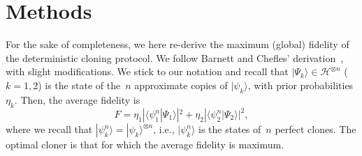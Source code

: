 \documentclass[aps,pra,twocolumn,showpacs]{revtex4-1}
\begin{document}
\section{Methods}

 For the sake of completeness, we here re-derive the maximum (global) fidelity of the deterministic cloning protocol. We follow Barnett and Chefles' derivation~\cite{Chefles+Barnett inter}, with slight modifications. We stick to our notation and recall that $|\Psi_k\rangle\in{\mathscr H}^{\otimes n}$ ($k=1,2$) is the state of the~$n$ approximate copies of $|\psi_k\rangle$, with prior probabilities $\eta_k$. Then, the average fidelity is
%
\begin{equation}
F=\eta_1|\langle \psi^n_1|\Psi_1\rangle|^2 +\eta_2|\langle \psi^n_2|\Psi_2\rangle|^2,
\end{equation}
%
where we recall that  $|\psi^n_k\rangle=|\psi_k\rangle^{\otimes n}$, i.e., $|\psi^n_k\rangle$ is the states of~$n$ perfect clones. The optimal cloner is that for which the average fidelity is maximum.
\end{document}
